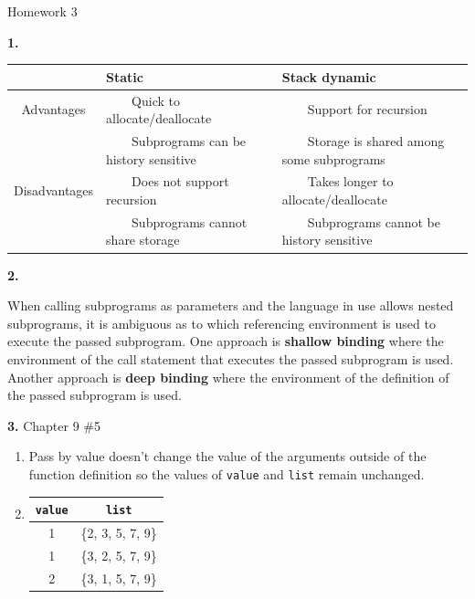 \documentclass[letterpaper, 11pt]{article}
\newcommand{\hwnumber}[1]{\medskip \noindent\textbf{#1.} \smallskip}
\newcommand{\hwnumbersec}[3]{\medskip \noindent\textbf{#1.} Chapter #2 \##3 \smallskip}
\newcommand{\tabitem}{~~\llap{\textbullet}~~}
\begin{document}
\begin{center}
	{\LARGE Homework 3}\\
\end{center}

\hwnumber{1}

\begin{center}
\begin{adjustbox}{width={\textwidth},keepaspectratio}
\begin{tabular}{c | l l}
	& Static & Stack dynamic \\
	\hline
	Advantages & \tabitem Quick to allocate/deallocate & \tabitem Support for recursion\\
		   & \tabitem Subprograms can be history sensitive & \tabitem Storage is shared among some subprograms\\
	Disadvantages & \tabitem Does not support recursion & \tabitem Takes longer to allocate/deallocate \\
		      & \tabitem Subprograms cannot share storage & \tabitem Subprograms cannot be history sensitive \\
\end{tabular}
\end{adjustbox}
\end{center}

\hwnumber{2}

When calling subprograms as parameters and the language in use allows nested
subprograms, it is ambiguous as to which referencing environment is used to
execute the passed subprogram. One approach is \textbf{shallow binding} where
the environment of the call statement that executes the passed subprogram is
used. Another approach is \textbf{deep binding} where the environment of the
definition of the passed subprogram is used. 

\hwnumbersec{3}{9}{5}

\begin{enumerate}[label=(\textbf{\alph*})]
	\item Pass by value doesn't change the value of the arguments outside of
		the function definition so the values of \texttt{value} and
		\texttt{list} remain unchanged.
	\item 
		\begin{tabular}{c c}
			\texttt{value} & \texttt{list} \\
			\hline
			1 & \{2, 3, 5, 7, 9\}\\
			1 & \{3, 2, 5, 7, 9\}\\
			2 & \{3, 1, 5, 7, 9\}
	\end{tabular}
\end{enumerate}
\end{document}

